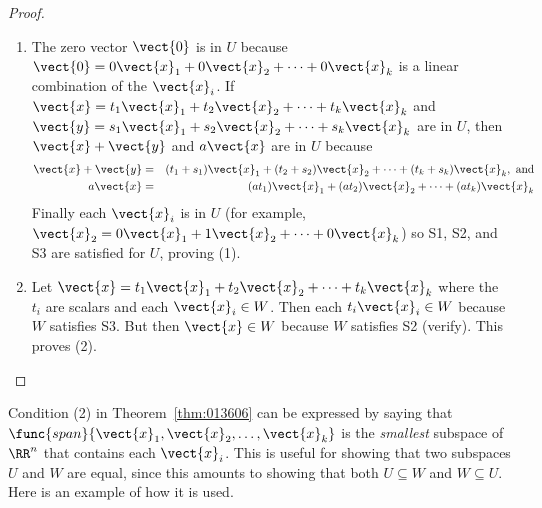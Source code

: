 \begin{proof}
\vspace*{-0.5em}
\begin{enumerate}
\item The zero vector $\vect{0}$ is in $U$ because $\vect{0} = 0\vect{x}_{1} + 0\vect{x}_{2} + \dots + 0\vect{x}_{k}$ is a linear combination of the $\vect{x}_{i}$. If $\vect{x} = t_{1}\vect{x}_{1} + t_{2}\vect{x}_{2} + \dots + t_{k}\vect{x}_{k}$ and $\vect{y} = s_{1}\vect{x}_{1} + s_{2}\vect{x}_{2} + \dots + s_{k}\vect{x}_{k}$ are in $U$, then $\vect{x} + \vect{y}$ and $a\vect{x}$ are in $U$ because
\vspace*{-0.5em}
\begin{eqnarray*}
\vect{x} + \vect{y} &=& (t_1 + s_1)\vect{x}_1 + (t_2 + s_2)\vect{x}_2 + \dots + (t_k + s_k)\vect{x}_k, \mbox{ and} \\
a\vect{x} &=& (at_1)\vect{x}_1 + (at_2)\vect{x}_2 + \dots + (at_k)\vect{x}_k
\end{eqnarray*}
Finally each $\vect{x}_i$ is in $U$ (for example, $\vect{x}_2 = 0\vect{x}_1 + 1\vect{x}_2 + \dots + 0\vect{x}_k$) so S1, S2, and S3 are satisfied for $U$, proving (1).

\item Let $\vect{x} = t_{1}\vect{x}_{1} + t_{2}\vect{x}_{2} + \dots + t_{k}\vect{x}_{k}$ where the $t_{i}$ are scalars and each $\vect{x}_{i} \in W$. Then each $t_{i}\vect{x}_{i} \in W$ because $W$ satisfies S3. But then $\vect{x} \in W$ because $W$ satisfies S2 (verify). This proves (2).
\end{enumerate}
\vspace*{-2em}\end{proof}

Condition (2) in Theorem~\ref{thm:013606} can be expressed by saying that $\func{span}\{\vect{x}_{1}, \vect{x}_{2}, \dots, \vect{x}_{k}\}$ is the \textit{smallest} subspace of $\RR^n$ that contains each $\vect{x}_{i}$. This is useful for showing that two subspaces $U$ and $W$ are equal, since this amounts to showing that both $U \subseteq W$ and $W \subseteq U$. Here is an example of how it is used.

